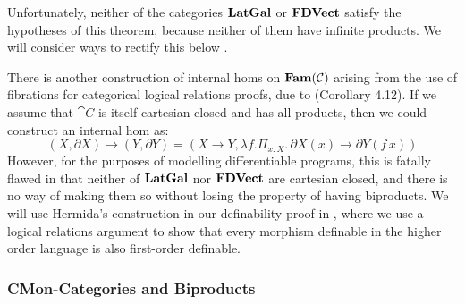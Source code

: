 Unfortunately, neither of the categories $\mathbf{LatGal}$ or $\mathbf{FDVect}$
satisfy the hypotheses of this theorem, because neither of them have
infinite products. We will consider ways to rectify this below
.

\begin{remark}
  \label{rem:hermida-exponentials}
  There is another construction of internal homs on $\mathbf{Fam}(\mathcal{C})$
  arising from the use of fibrations for categorical logical relations
  proofs, due to \citet{hermida99} (Corollary 4.12). If we assume that
  $\cat{C}$ is itself cartesian closed and has all products, then we
  could construct an internal hom as:
  \begin{displaymath}
    (X, \partial X) \to (Y, \partial Y) = (X \to Y, \lambda f. \Pi_{x : X}.\,\partial X(x) \to \partial Y(f\,x))
  \end{displaymath}
  However, for the purposes of modelling differentiable programs, this
  is fatally flawed in that neither of $\mathbf{LatGal}$ nor $\mathbf{FDVect}$ are
  cartesian closed, and there is no way of making them so without
  losing the property of having biproducts. We will use Hermida's
  construction in our definability proof in ,
  where we use a logical relations argument to show that every
  morphism definable in the higher order language is also first-order
  definable.
\end{remark}

\subsubsection{CMon-Categories and Biproducts}
\label{sec:biproducts}

